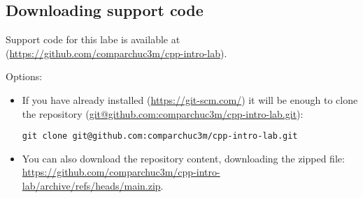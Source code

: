 \subsection{Downloading support code}

Support code for this labe is available at
 (\url{https://github.com/comparchuc3m/cpp-intro-lab}).

Options:

\begin{itemize}

\item 
If you have already installed  (\url{https://git-scm.com/}) 
it will be enough to clone the repository
(\url{git@github.com:comparchuc3m/cpp-intro-lab.git}):

\begin{lstlisting}[style=terminal]
git clone git@github.com:comparchuc3m/cpp-intro-lab.git
\end{lstlisting}

\item 
You can also download the repository content, downloading the zipped file:
\url{https://github.com/comparchuc3m/cpp-intro-lab/archive/refs/heads/main.zip}.

\end{itemize}


